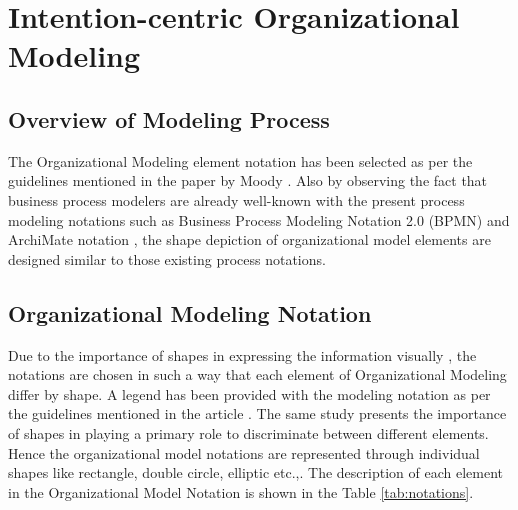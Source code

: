 \chapter{Intention-centric Organizational Modeling}
\label{chap:orgModeling}

\section{Overview of Modeling Process}
\label{sec:overviewmodelingprocess}
\hspace{4ex} The Organizational Modeling element notation has been selected as per the guidelines mentioned in the paper by Moody \cite{Moody2009}. Also by observing  the fact that business process modelers are already well-known with the present process modeling notations such as Business Process Modeling Notation 2.0 (BPMN) \cite{bpm2011} and ArchiMate notation \cite{arc2013}, the shape depiction of organizational model elements are designed similar to those existing process notations. 





\section{Organizational Modeling Notation}
\label{sec:orgmodelingnotation}
\hspace{4ex} Due to the importance of shapes in expressing the information visually , the notations are chosen in such a way that each element of Organizational Modeling  differ by shape. A legend has been provided with the modeling notation as per the guidelines mentioned in the article \cite{Moody2009}. The same study \cite{Moody2009} presents the importance of shapes in playing a primary role to discriminate between different elements. Hence the organizational model notations are represented through individual shapes like rectangle, double circle, elliptic etc.,. The description of each element in the Organizational Model Notation is shown in the Table \ref{tab:notations}. 

